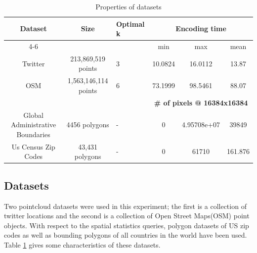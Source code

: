 \documentclass[sigconf]{acmart}
\begin{document}
\begin{table}[b!]
  \centering
  \begin{tabular}{|c|c|l|c|c|c|}
    \hline
    \multirow{2}{*}{\bfseries Dataset}   &
    \multirow{2}{*}{\bfseries Size}      &
    \multirow{2}{*}{\bfseries Optimal k} &
    \multicolumn{3}{|c|}{\bfseries Encoding time}                                                                                                      \\
    \cline{4-6}                          &                      &   & min                                                        & max         & mean  \\
    \hline
    Twitter                              & 213,869,519 points   & 3 & 10.0824                                                    & 16.0112     & 13.87 \\
    \hline
    OSM                                  & 1,563,146,114 points & 6 & 73.1999                                                    & 98.5461     & 88.07 \\
    \hline
                                         &                      &   & \multicolumn{3}{|c|}{\bfseries \# of pixels @ 16384x16384}                       \\
    \hline
    Global Administrative Boundaries     & 4456 polygons        & - & 0                                                          & 4.95708e+07 & 39849 \\
    \hline
    Us Census Zip Codes                  & 43,431 polygons      & - & 0                                                          & 61710
                                         & 161.876                                                                                                     \\
    \hline
  \end{tabular}
  \caption{Properties of datasets}
  \label{tab:datasets}
\end{table}


\subsection{Datasets}\label{datasets}

Two pointcloud datasets were used in this experiment; the first is a collection of twitter locations and the second is a collection of Open Street Maps(OSM) point objects. With respect to the spatial statistics queries, polygon datasets of US zip codes as well as bounding polygons of all countries in the world have been used.
Table \ref{tab:datasets} gives some characteristics of these datasets.
\end{document}
